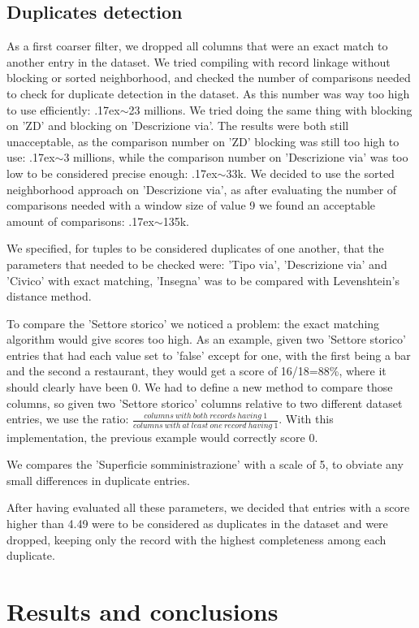 \documentclass{article}
\newcommand{\mytilde}{\raise.17ex\hbox{$\scriptstyle\sim$}}
\begin{document}
\subsection{Duplicates detection}
As a first coarser filter, we dropped all columns that were an exact match to another entry in the dataset. We tried compiling with record linkage without blocking or sorted neighborhood, and checked the number of comparisons needed to check for duplicate detection in the dataset. As this number was way too high to use efficiently: \mytilde23 millions. We tried doing the same thing with blocking on 'ZD' and blocking on 'Descrizione via'. The results were both still unacceptable, as the comparison number on 'ZD' blocking was still too high to use: \mytilde3 millions, while the comparison number on 'Descrizione via' was too low to be considered precise enough: \mytilde33k. We decided to use the sorted neighborhood approach on 'Descrizione via', as after evaluating the number of comparisons needed with a window size of value 9 we found an acceptable amount of comparisons: \mytilde135k. 

We specified, for tuples to be considered duplicates of one another, that the parameters that needed to be checked were: 'Tipo via', 'Descrizione via' and 'Civico' with exact matching, 'Insegna' was to be compared with Levenshtein's distance method. 

To compare the 'Settore storico' we noticed a problem: the exact matching algorithm would give scores too high. As an example, given two 'Settore storico' entries that had each value set to 'false' except for one, with the first being a bar and the second a restaurant, they would get a score of 16/18=88\%, where it should clearly have been 0.
We had to define a new method to compare those columns, so given two 'Settore storico' columns relative to two different dataset entries, we use the ratio: $\frac{columns\ with\ both\ records\ having\ 1}{columns\ with\ at\ least\ one\ record\ having\ 1}$. With this implementation, the previous example would correctly score 0.

We compares the 'Superficie somministrazione' with a scale of 5, to obviate any small differences in duplicate entries. 

After having evaluated all these parameters, we decided that entries with a score higher than 4.49 were to be considered as duplicates in the dataset and were dropped, keeping only the record with the highest completeness among each duplicate.

\section{Results and conclusions}
\end{document}
